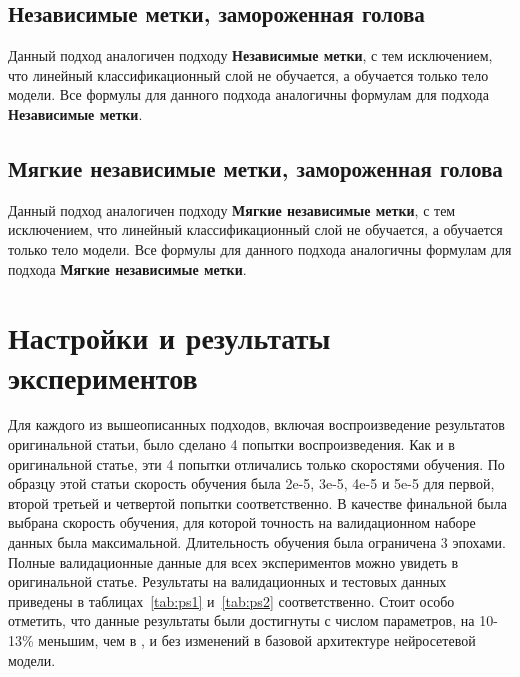 \subsection{Независимые метки, замороженная голова}\label{subch:pseudolabel/sect3/sub7}

Данный подход аналогичен подходу \textbf{Независимые метки}, с тем исключением, что линейный классификационный слой не обучается, а обучается только тело модели. Все формулы для данного подхода аналогичны формулам для подхода \textbf{Независимые метки}.

\subsection{Мягкие независимые метки, замороженная голова}\label{subch:pseudolabel/sect3/sub8}

Данный подход аналогичен подходу \textbf{Мягкие независимые метки}, с тем исключением, что линейный классификационный слой не обучается, а обучается только тело модели. Все формулы для данного подхода аналогичны формулам для подхода \textbf{Мягкие независимые метки}.
\section{Настройки и результаты экспериментов}\label{ch:pseudolabel/sect4}

Для каждого из вышеописанных подходов, включая воспроизведение результатов оригинальной статьи, было сделано 4 попытки воспроизведения. Как и в оригинальной статье, эти 4 попытки отличались только скоростями обучения. По образцу этой статьи скорость обучения была 2e-5, 3e-5, 4e-5 и 5e-5 для первой, второй третьей и четвертой попытки соответственно. В качестве финальной была выбрана скорость обучения, для которой точность на валидационном наборе данных была максимальной. Длительность обучения была ограничена 3 эпохами. Полные валидационные данные для всех экспериментов можно увидеть в оригинальной статье.
Результаты на валидационных и тестовых данных приведены в таблицах~\ref{tab:ps1} и~\ref{tab:ps2} соответственно. Стоит особо отметить, что данные результаты были достигнуты с числом параметров, на 10-13\% меньшим, чем в \cite{stickland_2019}, и без изменений в базовой архитектуре нейросетевой модели.

